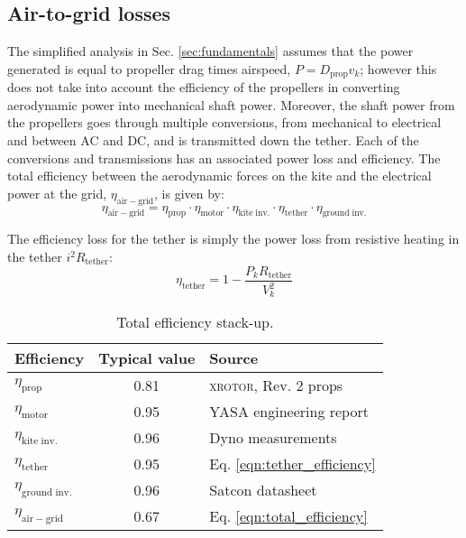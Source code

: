 \documentclass[11pt]{amsart}
\newcommand{\airgrid}{\mathrm{air-grid}}
\newcommand{\groundinverter}{\mathrm{ground\;inv.}}
\newcommand{\kiteinverter}{\mathrm{kite\;inv.}}
\newcommand{\kite}{k}
\newcommand{\motor}{\mathrm{motor}}
\newcommand{\prop}{\mathrm{prop}}
\newcommand{\tether}{\mathrm{tether}}
\begin{document}
\subsection{Air-to-grid losses}

The simplified analysis in Sec. \ref{sec:fundamentals} assumes that
the power generated is equal to propeller drag times airspeed,
$P = D_{\prop} v_{\kite}$; however this does not take into account the
efficiency of the propellers in converting aerodynamic power into
mechanical shaft power.  Moreover, the shaft power from the propellers
goes through multiple conversions, from mechanical to electrical and
between AC and DC, and is transmitted down the tether.  Each of the
conversions and transmissions has an associated power loss and
efficiency.  The total efficiency between the aerodynamic forces on
the kite and the electrical power at the grid, $\eta_{\airgrid}$, is
given by:
%
\begin{equation}
  \label{eqn:total_efficiency}
  \eta_{\airgrid} = \eta_{\prop} \cdot \eta_{\motor} \cdot \eta_{\kiteinverter}
  \cdot \eta_{\tether} \cdot \eta_{\groundinverter}
\end{equation}

The efficiency loss for the tether is simply the power loss from
resistive heating in the tether $i^2 R_{\tether}$:
%
\begin{equation}
  \label{eqn:tether_efficiency}
  \eta_{\tether} = 1 - \frac{P_{\kite} R_{\tether}}{V_{\kite}^2}
\end{equation}

\begin{table}[h]
\begin{tabular}{lcl}
\hline
\hline
Efficiency               & Typical value & Source \\
\hline
$\eta_{\prop}$           & 0.81          & \textsc{xrotor}, Rev. 2 props \\
$\eta_{\motor}$          & 0.95          & YASA engineering report \\
$\eta_{\kiteinverter}$   & 0.96          & Dyno measurements \\
$\eta_{\tether}$         & 0.95          & Eq. \ref{eqn:tether_efficiency} \\
$\eta_{\groundinverter}$ & 0.96          & Satcon datasheet \\
\hline
$\eta_{\airgrid}$        & 0.67          & Eq. \ref{eqn:total_efficiency} \\
\hline
\hline
\end{tabular}
\caption{Total efficiency stack-up.}
\end{table}
\end{document}
